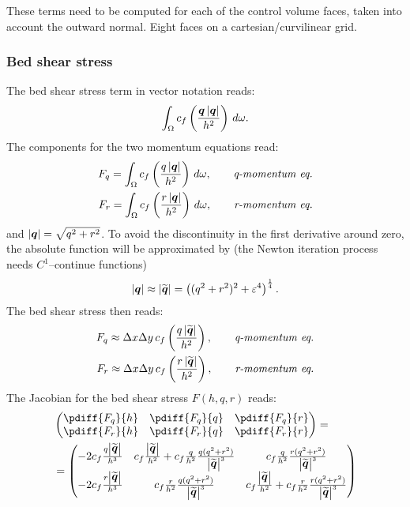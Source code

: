 These terms need to be computed for each of the control volume faces, taken into account the outward normal.
Eight faces on a cartesian/curvilinear grid.

\subsubsection{Bed shear stress}
The bed shear stress  term in vector notation reads:
\begin{align}
    \int_\Omega c_f \left( \frac{\mbox{\boldmath ${q}$}\left\lvert \mbox{\boldmath ${q}$} \right\rvert}{h^2} \right)\, d\omega.
\end{align}
The components for the two momentum equations read:
\begin{align}
    F_q = \int_\Omega c_f \left( \frac{q\left\lvert \mbox{\boldmath ${q}$} \right\rvert}{h^2} \right)\, d\omega, \qquad \textit{q-momentum eq.}
    \\
    F_r = \int_\Omega c_f \left( \frac{r\left\lvert \mbox{\boldmath ${q}$} \right\rvert}{h^2} \right)\, d\omega, \qquad \textit{r-momentum eq.}
\end{align}
and $\left\lvert \mbox{\boldmath ${q}$} \right\rvert = \sqrt{q^2 + r^2}$.
To avoid the discontinuity in the first derivative around zero, the absolute function will be approximated by (the Newton iteration process needs $C^1$--continue functions)
\begin{align}
    \left\lvert \mbox{\boldmath ${q}$} \right\rvert \approx \left\lvert \widetilde{\mbox{\boldmath ${q}$}} \right\rvert = \left( (q^2 + r^2)^2 + \varepsilon^4 \right)^{\frac{1}{4}}.
\end{align}
The bed shear stress then reads:
\begin{align}
    F_q \approx \Delta x\Delta y\, c_f \left( \frac{q\left\lvert \widetilde{\mbox{\boldmath ${q}$}} \right\rvert}{h^2} \right), \qquad \textit{q-momentum eq.}
    \\
    F_r \approx \Delta x\Delta y\, c_f \left( \frac{r\left\lvert \widetilde{\mbox{\boldmath ${q}$}} \right\rvert}{h^2} \right), \qquad \textit{r-momentum eq.}
\end{align}
The Jacobian for the bed shear stress $F(h,q,r)$ reads:
\begin{align}
    &\begin{pmatrix}
        \pdiff{F_q}{h} & \pdiff{F_q}{q} & \pdiff{F_q}{r}
        \\
        \pdiff{F_r}{h} & \pdiff{F_r}{q} & \pdiff{F_r}{r}
    \end{pmatrix}
    =
    \\
    &=
    \begin{pmatrix}
       -2c_f \frac{q\abs{\widetilde{\vec{q}}}}{h^3}
       & c_f\frac{\abs{\widetilde{\vec{q}}}}{h^2}
       + c_f \frac{q}{h^2} \frac{q(q^2+ r^2)}{\abs{\widetilde{\vec{q}}}^3}
       & c_f \frac{q}{h^2}\frac{r(q^2+ r^2)}{\abs{\widetilde{\vec{q}}}^3}
       \\
       -2c_f \frac{r\abs{\widetilde{\vec{q}}}}{h^3}
       & c_f \frac{r}{h^2}\frac{q(q^2+ r^2)}{\abs{\widetilde{\vec{q}}}^3}
       & c_f\frac{\abs{\widetilde{\vec{q}}}}{h^2}
       + c_f \frac{r}{h^2}\frac{r(q^2+ r^2)}{\abs{\widetilde{\vec{q}}}^3}
    \end{pmatrix}
\end{align}
